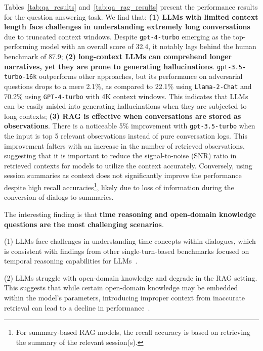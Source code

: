 Tables~\ref{tab:qa_results} and~\ref{tab:qa_rag_results} present the performance results for the question answering task. We find that:
\textbf{(1) LLMs with limited context length face challenges in understanding extremely long conversations} due to truncated context windows. Despite \texttt{gpt-4-turbo} emerging as the top-performing model with an overall score of 32.4, it notably lags behind the human benchmark of 87.9;
\textbf{(2) long-context LLMs can comprehend longer narratives, yet they are prone to generating hallucinations}. \texttt{gpt-3.5-turbo-16k} outperforms other approaches, but its performance on adversarial questions drops to a mere 2.1\%, as compared to 22.1\% using \texttt{Llama-2-Chat} and 70.2\% using \texttt{GPT-4-turbo} with 4K context windows. This indicates that LLMs can be easily misled into generating hallucinations when they are subjected to long contexts;
\textbf{(3) RAG is effective when conversations are stored as observations}. There is a noticeable 5\% improvement with \texttt{gpt-3.5-turbo} when the input is top 5 relevant observations instead of pure conversation logs. This improvement falters with an increase in the number of retrieved observations, suggesting that it is important to reduce the signal-to-noise (SNR) ratio in retrieved contexts for models to utilize the context accurately. Conversely, using session summaries as context does not significantly improve the performance despite high recall accuracies\footnote{For summary-based RAG models, the recall accuracy is based on retrieving the summary of the relevant session(s).}, likely due to loss of information during the conversion of dialogs to summaries.

The interesting finding is that \textbf{time reasoning and open-domain knowledge questions are the most challenging scenarios}.

(1) LLMs face challenges in understanding time concepts within dialogues, which is consistent with findings from other single-turn-based benchmarks focused on temporal reasoning capabilities for LLMs~\cite{wang2023tram}.

(2) LLMs struggle with open-domain knowledge and degrade in the RAG setting. This suggests that while certain open-domain knowledge may be embedded within the model's parameters, introducing improper context from inaccurate retrieval can lead to a decline in performance~\cite{mallen-etal-2023-trust}.


